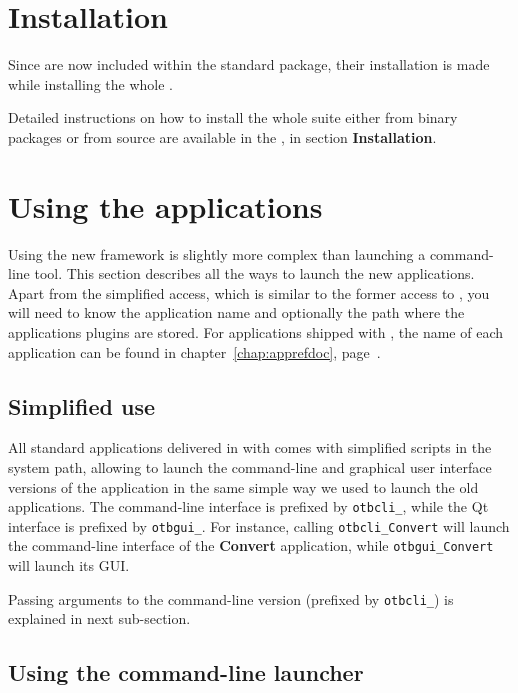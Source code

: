 \section{Installation}\label{sec:appinstall}

Since \app are now included within the standard \otb package, their 
installation is made while installing the whole \otb.

Detailed instructions on how to install the whole \otb suite either from 
binary packages or from source are available in the \sg, in section \textbf{Installation}.

\section{Using the applications}\label{sec:usingapps}

Using the new \app framework is slightly more complex than launching a
command-line tool. This section describes all the ways to launch the
new applications. Apart from the simplified access, which is similar
to the former access to \app, you will need to know the application 
name and optionally the path where the applications plugins are stored.
For applications shipped with \otb, the name of each 
application can be found in chapter~\ref{chap:apprefdoc}, 
page~\pageref{chap:apprefdoc}.

\subsection{Simplified use}

All standard applications delivered in with \otb comes with simplified
scripts in the system path, allowing to launch the command-line and
 graphical user interface versions of the application in the same simple way
 we used to launch the old applications. The command-line interface is prefixed by
\verb?otbcli_?, while the Qt interface is prefixed by
\verb?otbgui_?. For instance, calling \verb?otbcli_Convert? will
launch the command-line interface of the \textbf{Convert} application,
while \verb?otbgui_Convert? will launch its GUI.


Passing arguments to the command-line version (prefixed by
\verb?otbcli_?) is explained in next sub-section.

\subsection{Using the command-line launcher}

